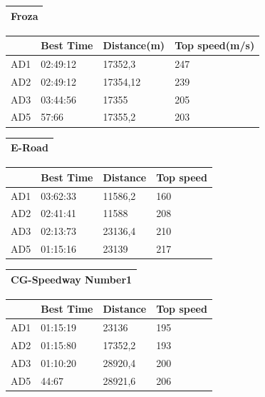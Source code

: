 \documentclass{llncs}
\begin{document}
\begin{table} [h!]
\begin{tabular}{ ||p{3cm}||p{3cm}||p{3cm}||p{3 cm}||}
	\end{tabular}
	\begin{tabular}{ |p{}|}
		\hline
		\textbf{Froza}   
		\\
		\hline
	\end{tabular}
	\begin{tabular}{ ||p{3cm}||p{3cm}||p{3cm}||p{3 cm}||}
		\hline
		{ \color{blue}\textbf{} }&
		{ \color{red}\textbf{Best Time} }&
		{ \color{red} \textbf{Distance(m) } } &
		{ \color{red} \textbf{Top speed(m/s)} }
		\\
		\hline
		AD1 & 02:49:12  &17352,3  &  247
		\\
		\hline
		AD2 & 02:49:12  & 17354,12 & 239
		\\
		\hline
		AD3 & 03:44:56 & 17355 & 205 
		\\
		\hline 
		AD5 & 57:66 & 17355,2 & 203 
		\\
		\hline 
		
	\end{tabular}
	\begin{tabular}{ |p{}|}
		\hline
		\textbf{E-Road}   
		\\
		\hline
	\end{tabular}
	\begin{tabular}{ ||p{3cm}||p{3cm}||p{3cm}||p{3 cm}||}
		\hline
		{ \color{blue}\textbf{} }&
		{ \color{red}\textbf{Best Time} }&
		{ \color{red} \textbf{Distance } } &
		{ \color{red} \textbf{Top speed} }
		\\
		\hline
		AD1 & 03:62:33 & 11586,2 &  160
		\\
		\hline
		AD2 & 02:41:41  & 11588 & 208 
		\\
		\hline
		AD3 & 02:13:73 & 23136,4& 210
		\\
		\hline 
		AD5 & 01:15:16 & 23139 & 217
		\\
		\hline 
		
	\end{tabular}
	\begin{tabular}{ |p{}|}
		\hline
		\textbf{CG-Speedway Number1}   
		\\
		\hline
	\end{tabular}
	\begin{tabular}{ ||p{3cm}||p{3cm}||p{3cm}||p{3 cm}||}
		\hline
		{ \color{blue}\textbf{} }&
		{ \color{red}\textbf{Best Time} }&
		{ \color{red} \textbf{Distance } } &
		{ \color{red} \textbf{Top speed} }
		\\
		\hline
		AD1 & 01:15:19 & 23136 &  195
		\\
		\hline
		AD2 & 01:15:80 & 17352,2 & 193 
		\\
		\hline
		AD3 & 01:10:20 & 28920,4 &200 
		\\
		\hline 
		AD5 & 44:67& 28921,6 &206 
		\\
		\hline 
		
	\end{tabular}
\end{table}
\newpage
\end{document}
